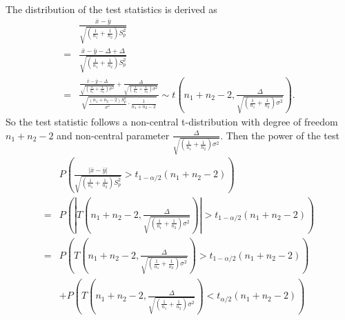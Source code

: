 \documentclass[a4paper,12pt]{article}
\begin{document}
The distribution of the test statistics is derived as
\[
  \begin{aligned}
    & \frac{
      \bar{x} - \bar{y}
    }{
      \sqrt{
        \left(\frac{1}{n_1} + \frac{1}{n_2}\right)
        S_p^2
      }
    }    \\
    =& \frac{
      \bar{x} - \bar{y}
      - \Delta
      + \Delta
    }{
      \sqrt{
        \left(\frac{1}{n_1} + \frac{1}{n_2}\right)
        S_p^2
      }
    }    \\
    =& \frac{
      \frac{
        \bar{x} - \bar{y} - \Delta
      }{
        \sqrt{\left(\frac{1}{n_1} + \frac{1}{n_2}\right)\sigma^2}
      }
      + \frac{\Delta}{\sqrt{\left(\frac{1}{n_1} + \frac{1}{n_2}\right)\sigma^2}}    
    }{
      \sqrt{
        \frac{\left(n_1 + n_2 - 2\right)S_p^2}{\sigma^2}
        \cdot \frac{1}{n_1 + n_2 - 2}
      }
    }
    \sim t(
    n_1 + n_2 - 2,
    \frac{\Delta}{\sqrt{\left(\frac{1}{n_1} + \frac{1}{n_2}\right)\sigma^2}}
    )
    .
  \end{aligned}
\]
So the test statistic follows a non-central t-distribution with degree of freedom $n_1 + n_2 - 2$ and non-central parameter $\frac{\Delta}{\sqrt{\left(\frac{1}{n_1} + \frac{1}{n_2}\right)\sigma^2}}$. Then the power of the test
\begin{equation}
  \label{eq:power_equation_two_sample_variance_equal_but_unknown}
  \begin{aligned}
    & P\left(
      \frac{
        \left|\bar{x} - \bar{y}\right|
      }{
        \sqrt{
          \left(\frac{1}{n_1} + \frac{1}{n_2}\right)
          S_p^2
        }
      }
      > t_{1 - \alpha / 2}\left(n_1 + n_2 - 2\right)
    \right)    \\
    =& P\left(
      \left|
        T{\left(
            n_1 + n_2 - 2,
            \frac{\Delta}{\sqrt{\left(\frac{1}{n_1} + \frac{1}{n_2}\right)\sigma^2}}
          \right)}
      \right|
      > t_{1 - \alpha / 2}\left(n_1 + n_2 - 2\right)
    \right)    \\
    =& P\left(
      T{\left(
          n_1 + n_2 - 2,
          \frac{\Delta}{\sqrt{\left(\frac{1}{n_1} + \frac{1}{n_2}\right)\sigma^2}}
        \right)}
      > t_{1 - \alpha / 2}\left(n_1 + n_2 - 2\right)
    \right)    \\
    &+ P\left(
      T{\left(
          n_1 + n_2 - 2,
          \frac{\Delta}{\sqrt{\left(\frac{1}{n_1} + \frac{1}{n_2}\right)\sigma^2}}
        \right)}
      < t_{\alpha / 2}\left(n_1 + n_2 - 2\right)
    \right)    \\
  \end{aligned}
\end{equation}
\end{document}
